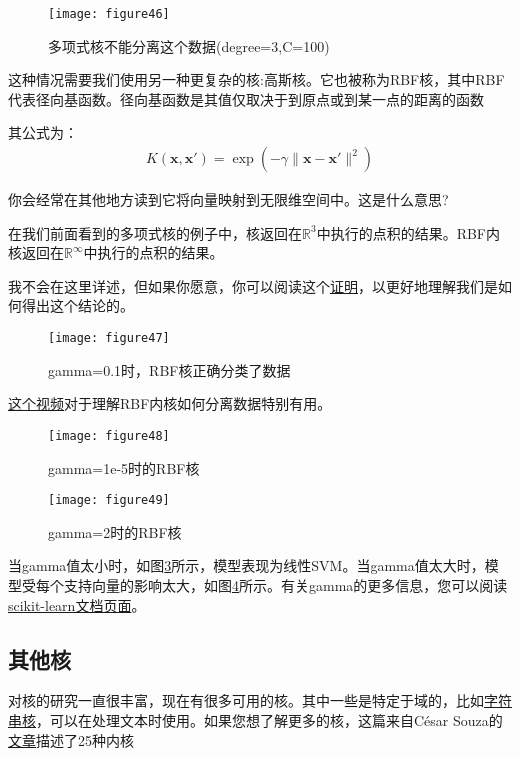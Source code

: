\begin{figure}[ht]
	\centering
	\texttt{[image: figure46]}
	\caption{多项式核不能分离这个数据(degree=3,C=100)}
	\label{figure46}
\end{figure}

这种情况需要我们使用另一种更复杂的核:高斯核。它也被称为RBF核，其中RBF代表径向基函数。径向基函数是其值仅取决于到原点或到某一点的距离的函数

其公式为：
\begin{gather*}
K(\mathbf{x},\mathbf{x}') = \exp(-\gamma\|\mathbf{x}-\mathbf{x}'\|^2)
\end{gather*}

你会经常在其他地方读到它将向量映射到无限维空间中。这是什么意思?

在我们前面看到的多项式核的例子中，核返回在$\mathbb{R}^3$中执行的点积的结果。RBF内核返回在$\mathbb{R}^\infty$中执行的点积的结果。

我不会在这里详述，但如果你愿意，你可以阅读这个\href{http://pages.cs.wisc.edu/~matthewb/pages/notes/pdf/svms/RBFKernel.pdf}{证明}，以更好地理解我们是如何得出这个结论的。

\begin{figure}[ht]
	\centering
	\texttt{[image: figure47]}
	\caption{gamma=0.1时，RBF核正确分类了数据}
	\label{figure47}
\end{figure}

\href{https://www.youtube.com/watch?v=3liCbRZPrZA}{这个视频}对于理解RBF内核如何分离数据特别有用。

\begin{figure}[ht]
	\centering
	\texttt{[image: figure48]}
	\caption{gamma=1e-5时的RBF核}
	\label{figure48}
\end{figure}

\begin{figure}[ht]
	\centering
	\texttt{[image: figure49]}
	\caption{gamma=2时的RBF核}
	\label{figure49}
\end{figure}


当gamma值太小时，如图\ref{figure48}所示，模型表现为线性SVM。当gamma值太大时，模型受每个支持向量的影响太大，如图\ref{figure49}所示。有关gamma的更多信息，您可以阅读\href{http://scikit-learn.org/stable/auto_examples/svm/plot_rbf_parameters.html}{scikit-learn文档页面}。

\subsection{其他核}

对核的研究一直很丰富，现在有很多可用的核。其中一些是特定于域的，比如\href{https://en.wikipedia.org/wiki/String_kernel}{字符串核}，可以在处理文本时使用。如果您想了解更多的核，这篇来自César Souza的\href{http://crsouza.com/2010/03/17/kernel-functions-for-machine-learning-applications/}{文章}描述了25种内核

